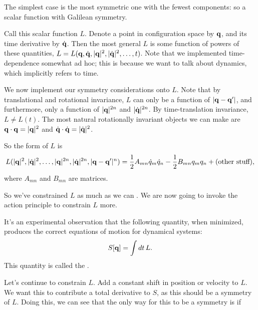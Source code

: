 \documentclass[11pt]{article}
\begin{document}
\begin{reemark}
    The simplest case is the most symmetric one with the fewest
    components: so a scalar function with Galilean symmetry.
\end{reemark}

\begin{iidea}
    Call this scalar function $L$. Denote a point in configuration space
    by $\mathbf{q}$, and its time derivative by $\dot{\mathbf{q}}$. Then the most
    general $L$ is some function of powers of these quantities, $L = L(\mathbf{q}, \dot{\mathbf{q}}, |\mathbf{q}|^2, |\dot{\mathbf{q}}|^2, \ldots, t)$.
    Note that we implemented time-dependence somewhat ad hoc; this is because
    we want to talk about dynamics, which implicitly refers to time.
 
    We now implement our symmetry considerations onto $L$.
    Note that by translational and rotational invariance, $L$ can only
    be a function of $|\mathbf{q} - \mathbf{q}'|$, and furthermore,
    only a function of $|\mathbf{q}|^{2n}$ and $|\dot{\mathbf{q}}|^{2n}$. By time-translation
    invariance, $L \neq L(t)$. The most natural rotationally invariant
    objects we can make are $\mathbf{q} \cdot \mathbf{q} = |\mathbf{q}|^2$ and $\dot{\mathbf{q}} \cdot \dot{\mathbf{q}} = |\dot{\mathbf{q}}|^2$.

    So the form of $L$ is
    \begin{align*}
        L(|\mathbf{q}|^2, |\dot{\mathbf{q}}|^2, \ldots, |\mathbf{q}|^{2n}, |\dot{\mathbf{q}}|^{2n}, |\mathbf{q} - \mathbf{q}'|^n) 
        = \frac{1}{2} A_{mn} \dot{q}_m \dot{q}_n - \frac{1}{2} B_{mn} q_m q_n + (\text{other stuff}),
    \end{align*}
    where $A_{mn}$ and $B_{mn}$ are matrices.
\end{iidea}

So we've constrained $L$ as much as we can .
We are now going to invoke the action principle to constrain $L$
more.

\begin{iidea}
    It's an experimental observation that the following quantity,
    when minimized, produces the correct equations of motion for 
    dynamical systems:
    \begin{align*}
        S[\mathbf{q}] = \int dt \, L.
    \end{align*}
    This quantity is called the .
\end{iidea}

Let's continue to constrain $L$. Add a constant
shift in position or velocity to $L$. We want this
to contribute a total derivative to $S$, as this should
be a symmetry of $L$. Doing this, we can see that the only
way for this to be a symmetry is if 
\end{document}
